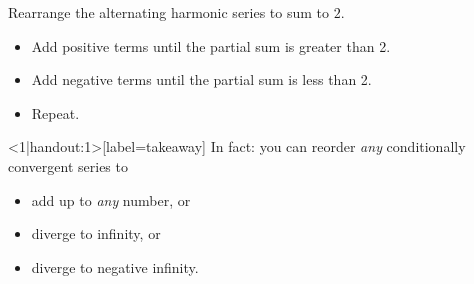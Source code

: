 \begin{frame}[t]
Rearrange the alternating harmonic series to sum to $2$. 
\vfill
\begin{itemize}
\item \color{M3} Add positive terms until the partial sum is greater than 2.
\item \color{M4} Add negative terms until the partial sum is less than 2.
\item \color{black} Repeat.
\end{itemize}
\hypertarget<34>{end2sum}{}
\end{frame}
\begin{frame}<1|handout:1>[label=takeaway]
In fact: you can reorder \textit{any} conditionally convergent series to
\begin{itemize}
\item  add up to \textit{any} number, or
\item diverge to infinity, or 
\item diverge to negative infinity.
\end{itemize}\vfill
{}
\end{frame}
